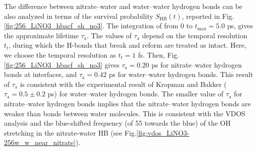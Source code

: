 %
The difference between nitrate--water and water--water hydrogen bonds 
can be also analyzed in terms of the survival probability $S_{\text{HB}}(t)$, \cite{AKS86,JT90,AL96} 
reported in Fig.\thinspace\ref {fig:256_LiNO3_hbacf_sh_no3}.
The integration of \SHB from 0 to $t_{\max}=5.0$ ps, \cite{Steinel2004} gives the approximate lifetime $\tau_\text{a}$. \cite{SC02} 
The values of $\tau_{\text{a}}$ depend on the temporal resolution $t_t$, during which the H-bonds that break and reform are treated as intact. \cite{AL00} 
%
Here, we choose the temporal resolution as $t_t=1$ fs. 
Then, Fig.\thinspace\ref {fig:256_LiNO3_hbacf_sh_no3} gives $\tau_\text{a}=0.20$ ps for nitrate--water hydrogen bonds at interfaces, and $\tau_\text{a}=0.42$ ps for water--water hydrogen bonds.
This result of $\tau_\text{a}$ is consistent with the experimental result of Kropman and Bakker ($\tau_\text{a}=0.5\pm0.2$ ps) for water--water hydrogen bonds. 
\cite{MFK01} %
The smaller value of $\tau_\text{a}$ for nitrate--water hydrogen bonds implies that the nitrate--water hydrogen bonds are weaker than bonds between water molecules. 
This is consistent with the VDOS analysis and the blue-shifted frequency (of 55 \cm towards the blue) of the OH stretching in the nitrate-water HB 
(see Fig.\thinspace\ref{fig:vdos_LiNO3-256w_w_near_nitrate}). 



